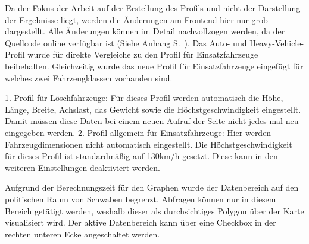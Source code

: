 \bigskip

Da der Fokus der Arbeit auf der Erstellung des Profils und nicht der Darstellung der Ergebnisse liegt, werden die Änderungen am Frontend hier nur grob dargestellt.
Alle Änderungen können im Detail nachvollzogen werden, da der Quellcode online verfügbar ist (Siehe Anhang S.~\pageref{sec:anhang}). Das Auto- und Heavy-Vehicle-Profil wurde für direkte Vergleiche zu den Profil für Einsatzfahrzeuge beibehalten.
Gleichzeitig wurde das neue Profil für Einsatzfahrzeuge eingefügt für welches zwei Fahrzeugklassen vorhanden sind.

\bigskip

1. Profil für Löschfahrzeuge: Für dieses Profil werden automatisch die Höhe, Länge, Breite, Achslast, das Gewicht sowie die Höchstgeschwindigkeit eingestellt.
Damit müssen diese Daten bei einem neuen Aufruf der Seite nicht jedes mal neu eingegeben werden.
2. Profil allgemein für Einsatzfahrzeuge: Hier werden Fahrzeugdimensionen nicht automatisch eingestellt.
Die Höchstgeschwindigkeit für dieses Profil ist standardmäßig auf 130km/h gesetzt.
Diese kann in den weiteren Einstellungen deaktiviert werden.

\bigskip

Aufgrund der Berechnungszeit für den Graphen wurde der Datenbereich auf den politischen Raum von Schwaben begrenzt.
Abfragen können nur in diesem Bereich getätigt werden, weshalb dieser als durchsichtiges Polygon über der Karte visualisiert wird.
Der aktive Datenbereich kann über eine Checkbox in der rechten unteren Ecke angeschaltet werden.
